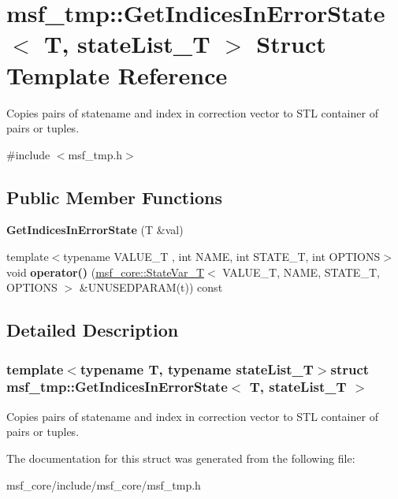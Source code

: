 \hypertarget{structmsf__tmp_1_1GetIndicesInErrorState}{\section{msf\-\_\-tmp\-:\-:Get\-Indices\-In\-Error\-State$<$ T, state\-List\-\_\-\-T $>$ Struct Template Reference}
\label{structmsf__tmp_1_1GetIndicesInErrorState}
}


Copies pairs of statename and index in correction vector to S\-T\-L container of pairs or tuples.  




{\ttfamily \#include $<$msf\-\_\-tmp.\-h$>$}

\subsection*{Public Member Functions}
\begin{DoxyCompactItemize}
\item 
\hypertarget{structmsf__tmp_1_1GetIndicesInErrorState_ac6acac49c18bc83f47687022c90e09c4}{{\bfseries Get\-Indices\-In\-Error\-State} (T \&val)}\label{structmsf__tmp_1_1GetIndicesInErrorState_ac6acac49c18bc83f47687022c90e09c4}

\item 
\hypertarget{structmsf__tmp_1_1GetIndicesInErrorState_a930484a708220e0bf2ecf4f415c96e02}{{\footnotesize template$<$typename V\-A\-L\-U\-E\-\_\-\-T , int N\-A\-M\-E, int S\-T\-A\-T\-E\-\_\-\-T, int O\-P\-T\-I\-O\-N\-S$>$ }\\void {\bfseries operator()} (\hyperlink{structmsf__core_1_1StateVar__T}{msf\-\_\-core\-::\-State\-Var\-\_\-\-T}$<$ V\-A\-L\-U\-E\-\_\-\-T, N\-A\-M\-E, S\-T\-A\-T\-E\-\_\-\-T, O\-P\-T\-I\-O\-N\-S $>$ \&U\-N\-U\-S\-E\-D\-P\-A\-R\-A\-M(t)) const }\label{structmsf__tmp_1_1GetIndicesInErrorState_a930484a708220e0bf2ecf4f415c96e02}

\end{DoxyCompactItemize}


\subsection{Detailed Description}
\subsubsection*{template$<$typename T, typename state\-List\-\_\-\-T$>$struct msf\-\_\-tmp\-::\-Get\-Indices\-In\-Error\-State$<$ T, state\-List\-\_\-\-T $>$}

Copies pairs of statename and index in correction vector to S\-T\-L container of pairs or tuples. 

The documentation for this struct was generated from the following file\-:\begin{DoxyCompactItemize}
\item 
msf\-\_\-core/include/msf\-\_\-core/msf\-\_\-tmp.\-h\end{DoxyCompactItemize}
